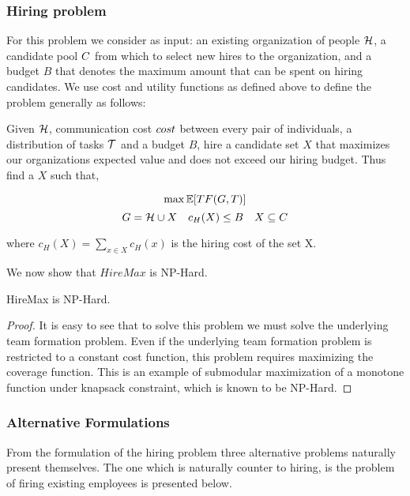 \subsubsection{Hiring problem}

For this problem we consider as input: an existing organization of people $\mathcal{H}$, a candidate pool ${C}$ from which to select new hires to the organization, and a budget $B$ that denotes the maximum amount that can be spent on hiring candidates.
We use cost and utility functions as defined above to define the problem generally as follows:
\begin{problem}
[HireMax] Given $\mathcal{H}$, communication cost $cost$ between every pair of individuals, a distribution of tasks $\mathcal{T}$ and a budget $B$, hire a candidate set $X$ that maximizes our organizations expected value and does not exceed our hiring budget. Thus find a $X$ such that,

$$ \max \mathbb{E}[TF(G,T)]  $$
$$ G=\mathcal{H}  \cup X \quad c_H(X) \le B \quad X \subseteq C $$

where $c_H(X) = \sum_{x \in X} c_H(x)$ is the hiring cost of the set X.
 
\end{problem}
	
We now show that $HireMax$ is NP-Hard.

\begin{theorem} \label{thm:HM-hardness}
HireMax is NP-Hard.
\end{theorem}

\begin{proof}
It is easy to see that to solve this problem we must solve the underlying team formation problem. Even if the underlying team formation problem is restricted to a constant cost function, this problem requires maximizing the coverage function. This is an example of submodular maximization of a monotone function under knapsack constraint, which is known to be NP-Hard.  
\end{proof}

\subsubsection{Alternative Formulations}

From the formulation of the hiring problem three alternative problems naturally present themselves. The one which is naturally counter to hiring, is the problem of firing existing employees is presented below.  


